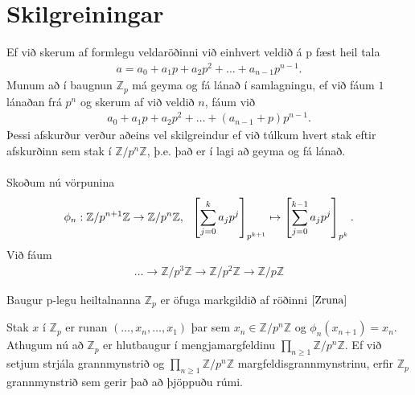 \section*{Skilgreiningar}
Ef við skerum af formlegu veldaröðinni við einhvert veldið á p fæst heil tala 
\begin{align*}
a = a_0 + a_1 p + a_2 p^2 + \ldots + a_{n-1}p^{n-1}. 
\end{align*}
Munum að í baugnun $\mathbb{Z}_p$ má geyma og fá lánað í samlagningu, ef við 
fáum $1$ lánaðan frá $p^n$ og skerum af við veldið $n$, fáum við 
\begin{align*}
 a_0 + a_1 p + a_2 p^2 + \ldots + (a_{n-1} + p)p^{n-1}.
\end{align*}
Þessi afskurður verður aðeins vel skilgreindur ef við túlkum hvert 
stak eftir afskurðinn sem stak í $\mathbb{Z}/p^n \mathbb{Z}$, þ.e. það 
er í lagi að geyma og fá lánað.\\
\\Skoðum nú vörpunina
\begin{align*}
 \centering \phi_n : \mathbb{Z}/p^{n+1} \mathbb{Z} \rightarrow 
 \mathbb{Z}/p^{n} \mathbb{Z}, \ \  \left[\sum_{j=0}^k a_j p^j \right]
_{p^{k+1}} \mapsto \left[\sum_{j=0}^{k-1} a_j p^j \right]_{p^k}.
\end{align*}
Við fáum
\begin{align}\label{Zruna}
 \ldots \rightarrow \mathbb{Z}/p^{3} \mathbb{Z} \rightarrow \mathbb{Z}/p^{2} 
\mathbb{Z} \rightarrow \mathbb{Z}/p \mathbb{Z}
\end{align}
\begin{skilgr}
 Baugur p-legu heiltalnanna $\mathbb{Z}_p$ er öfuga markgildið af 
röðinni $\ref{Zruna}$
\end{skilgr}
Stak $x$ í $\mathbb{Z}_p$ er runan $(\ldots , x_n, \ldots, x_1)$ þar sem 
$x_n \in \mathbb{Z}/p^n\mathbb{Z}$ og $\phi_n(x_{n+1}) = x_{n}$.
Athugum nú að $\mathbb{Z}_p$ er hlutbaugur í mengjamargfeldinu
 $\prod_{n \geq 1} \mathbb{Z}/p^n\mathbb{Z}$. Ef við setjum strjála 
grannmynstrið og $\prod_{n \geq 1} \mathbb{Z}/p^n\mathbb{Z}$ 
margfeldisgrannmynstrinu, erfir $\mathbb{Z}_p$ grannmynstrið sem 
gerir það að þjöppuðu rúmi.\\
